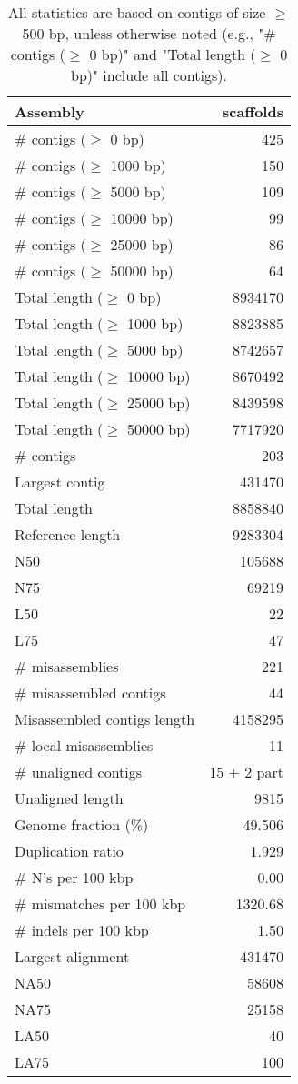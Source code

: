 \documentclass[12pt,a4paper]{article}
\begin{document}
\begin{table}[ht]
\begin{center}
\caption{All statistics are based on contigs of size $\geq$ 500 bp, unless otherwise noted (e.g., "\# contigs ($\geq$ 0 bp)" and "Total length ($\geq$ 0 bp)" include all contigs).}
\begin{tabular}{|l*{1}{|r}|}
\hline
Assembly & scaffolds \\ \hline
\# contigs ($\geq$ 0 bp) & 425 \\ \hline
\# contigs ($\geq$ 1000 bp) & 150 \\ \hline
\# contigs ($\geq$ 5000 bp) & 109 \\ \hline
\# contigs ($\geq$ 10000 bp) & 99 \\ \hline
\# contigs ($\geq$ 25000 bp) & 86 \\ \hline
\# contigs ($\geq$ 50000 bp) & 64 \\ \hline
Total length ($\geq$ 0 bp) & 8934170 \\ \hline
Total length ($\geq$ 1000 bp) & 8823885 \\ \hline
Total length ($\geq$ 5000 bp) & 8742657 \\ \hline
Total length ($\geq$ 10000 bp) & 8670492 \\ \hline
Total length ($\geq$ 25000 bp) & 8439598 \\ \hline
Total length ($\geq$ 50000 bp) & 7717920 \\ \hline
\# contigs & 203 \\ \hline
Largest contig & 431470 \\ \hline
Total length & 8858840 \\ \hline
Reference length & 9283304 \\ \hline
N50 & 105688 \\ \hline
N75 & 69219 \\ \hline
L50 & 22 \\ \hline
L75 & 47 \\ \hline
\# misassemblies & 221 \\ \hline
\# misassembled contigs & 44 \\ \hline
Misassembled contigs length & 4158295 \\ \hline
\# local misassemblies & 11 \\ \hline
\# unaligned contigs & 15 + 2 part \\ \hline
Unaligned length & 9815 \\ \hline
Genome fraction (\%) & 49.506 \\ \hline
Duplication ratio & 1.929 \\ \hline
\# N's per 100 kbp & 0.00 \\ \hline
\# mismatches per 100 kbp & 1320.68 \\ \hline
\# indels per 100 kbp & 1.50 \\ \hline
Largest alignment & 431470 \\ \hline
NA50 & 58608 \\ \hline
NA75 & 25158 \\ \hline
LA50 & 40 \\ \hline
LA75 & 100 \\ \hline
\end{tabular}
\end{center}
\end{table}
\end{document}
